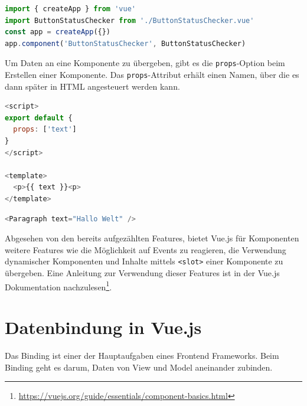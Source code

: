 
\begin{lstlisting}[caption={Globale Registrierung einer Komponente},language=javascript,label={lst:Globale Registrierung}]
import { createApp } from 'vue'
import ButtonStatusChecker from './ButtonStatusChecker.vue'
const app = createApp({})
app.component('ButtonStatusChecker', ButtonStatusChecker)
\end{lstlisting}


Um Daten an eine Komponente zu übergeben, gibt es die \texttt{props}-Option beim Erstellen einer Komponente.
Das \texttt{props}-Attribut erhält einen Namen, über die es dann später in
HTML angesteuert werden kann. \cite{vueComponents}

\newpage

\begin{lstlisting}[caption={Erstellung eines \texttt{props}},language=javascript,label={lst:Erstellung eines props}]
<script>
export default {
  props: ['text']
}
</script>

<template>
  <p>{{ text }}<p>
</template>
\end{lstlisting}

\begin{lstlisting}[caption={Nutzung eines \texttt{props}},language=javascript,label={lst:Nutzung eines props}]
<Paragraph text="Hallo Welt" />
\end{lstlisting}

Abgesehen von den bereits aufgezählten Features, bietet Vue.js für Komponenten weitere Features wie die Möglichkeit auf Events zu reagieren,
die Verwendung dynamischer Komponenten und Inhalte mittels \texttt{<slot>} einer Komponente zu übergeben.
Eine Anleitung zur Verwendung dieser Features ist in der Vue.js Dokumentation nachzulesen\footnote{\url{https://vuejs.org/guide/essentials/component-basics.html}}.
\cite{vueComponents}



\section{Datenbindung in Vue.js}\label{sec:datenbindung-in-vue.js}
Das Binding ist einer der Hauptaufgaben eines Frontend Frameworks.
Beim Binding geht es darum, Daten von View und Model aneinander zubinden. \cite[S. 11]{steyer2019}

